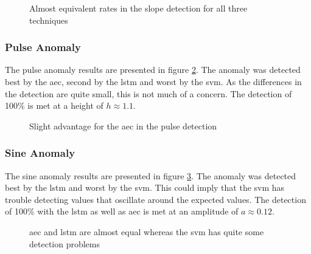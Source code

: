 \begin{figure}[htb]
\centering
\begin{minipage}[t]{0.45\textwidth}
		
\end{minipage}
\begin{minipage}[t]{0.45\textwidth}
		
\end{minipage}
\caption{Almost equivalent rates in the slope detection for all three techniques}
\label{f:slope}
\end{figure}
		
	\subsubsection{Pulse Anomaly}
	The pulse anomaly results are presented in figure \ref{f:pulse}. The anomaly was detected best by the \ac{aec}, second by the \ac{lstm} and worst by the \ac{svm}. As the differences in the detection are quite small, this is not much of a concern. \newline
	The detection of 100\% is met at a height of $h \approx \num{1.1}$. 

\begin{figure}[htb]
\centering
\begin{minipage}[t]{0.45\textwidth}
		
\end{minipage}
\begin{minipage}[t]{0.45\textwidth}
		
\end{minipage}
\caption{Slight advantage for the \ac{aec} in the pulse detection}
\label{f:pulse}
\end{figure}
		
	\subsubsection{Sine Anomaly}
		The sine anomaly results are presented in figure \ref{f:sine}. The anomaly was detected best by the \ac{lstm} and worst by the \ac{svm}. This could imply that the \ac{svm} has trouble detecting values that oscillate around the expected values.\newline	
	The detection of 100\% with the \ac{lstm} as well as \ac{aec} is met at an amplitude of $a \approx \num{0.12}$. 

\begin{figure}[htb]
\centering
\begin{minipage}[t]{0.45\textwidth}
		
\end{minipage}
\begin{minipage}[t]{0.45\textwidth}
		
\end{minipage}
\caption{\ac{aec} and \ac{lstm} are almost equal whereas the \ac{svm} has quite some detection problems}
\label{f:sine}
\end{figure}